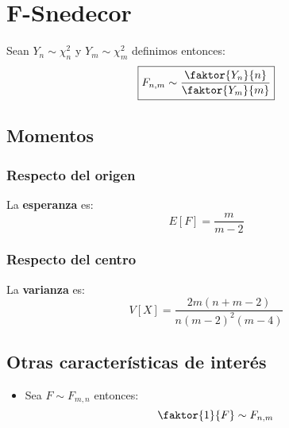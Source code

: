 \section{F-Snedecor}
\label{sec:f_snedecor}
Sean $Y_n \sim \chi^2_n$ y $Y_m \sim \chi^2_m$ definimos entonces:
\[
\boxed{F_{n, m} \sim \frac{\faktor{Y_n}{n}}{\faktor{Y_m}{m}}}
\]

\subsection{Momentos}

\subsubsection*{Respecto del origen}
La \textbf{esperanza} es: 
\[
    E\left[ F \right] = \frac{m}{m - 2}
\]
\subsubsection*{Respecto del centro}
La \textbf{varianza} es:
\[
    V\left[ X \right] = \frac{2 m \left( n + m - 2 \right)}{n \left( m - 2 \right)^2 \left( m - 4 \right)}
\]

\subsection{Otras características de interés}
\begin{itemize}
    \item Sea $F \sim F_{m, n}$ entonces:
    \[
    \faktor{1}{F} \sim F_{n, m}
    \]
\end{itemize}
